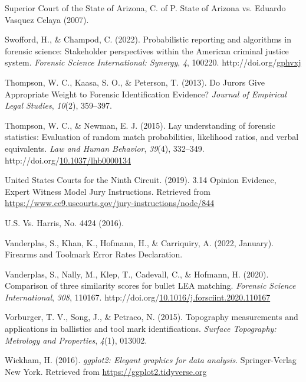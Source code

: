 \documentclass[print]{nuthesis}
\newlength{\cslhangindent}
\newenvironment{CSLReferences}[2]%
{\setlength{\parindent}{0pt}%
\everypar{\setlength{\hangindent}{\cslhangindent}}\ignorespaces}%
{\par}
\begin{document}
\begin{CSLReferences}{1}{0}
\leavevmode{}%
Superior Court of the State of Arizona, C. of P. State of {Arizona} vs. Eduardo {Vasquez} {Celaya} (2007).

\leavevmode{}%
Swofford, H., \& Champod, C. (2022). Probabilistic reporting and algorithms in forensic science: {Stakeholder} perspectives within the {American} criminal justice system. \emph{Forensic Science International: Synergy}, \emph{4}, 100220. http://doi.org/\href{https://doi.org/gphvxj}{gphvxj}

\leavevmode{}%
Thompson, W. C., Kaasa, S. O., \& Peterson, T. (2013). Do {Jurors} {Give} {Appropriate} {Weight} to {Forensic} {Identification} {Evidence}? \emph{Journal of Empirical Legal Studies}, \emph{10}(2), 359--397.

\leavevmode{}%
Thompson, W. C., \& Newman, E. J. (2015). Lay understanding of forensic statistics: {Evaluation} of random match probabilities, likelihood ratios, and verbal equivalents. \emph{Law and Human Behavior}, \emph{39}(4), 332--349. http://doi.org/\href{https://doi.org/10.1037/lhb0000134}{10.1037/lhb0000134}

\leavevmode{}%
United States Courts for the Ninth Circuit. (2019). 3.14 {Opinion} {Evidence}, {Expert} {Witness} {\textbar} {Model} {Jury} {Instructions}. Retrieved from \url{https://www.ce9.uscourts.gov/jury-instructions/node/844}

\leavevmode{}%
{U.S.} Vs. {Harris}, No. 4424 (2016).

\leavevmode{}%
Vanderplas, S., Khan, K., Hofmann, H., \& Carriquiry, A. (2022, January). Firearms and {Toolmark} {Error} {Rates} {Declaration}.

\leavevmode{}%
Vanderplas, S., Nally, M., Klep, T., Cadevall, C., \& Hofmann, H. (2020). Comparison of three similarity scores for bullet {LEA} matching. \emph{Forensic Science International}, \emph{308}, 110167. http://doi.org/\href{https://doi.org/10.1016/j.forsciint.2020.110167}{10.1016/j.forsciint.2020.110167}

\leavevmode{}%
Vorburger, T. V., Song, J., \& Petraco, N. (2015). Topography measurements and applications in ballistics and tool mark identifications. \emph{Surface Topography: Metrology and Properties}, \emph{4}(1), 013002.

\leavevmode{}%
Wickham, H. (2016). \emph{ggplot2: Elegant graphics for data analysis}. Springer-Verlag New York. Retrieved from \url{https://ggplot2.tidyverse.org}

\end{CSLReferences}
\end{document}
